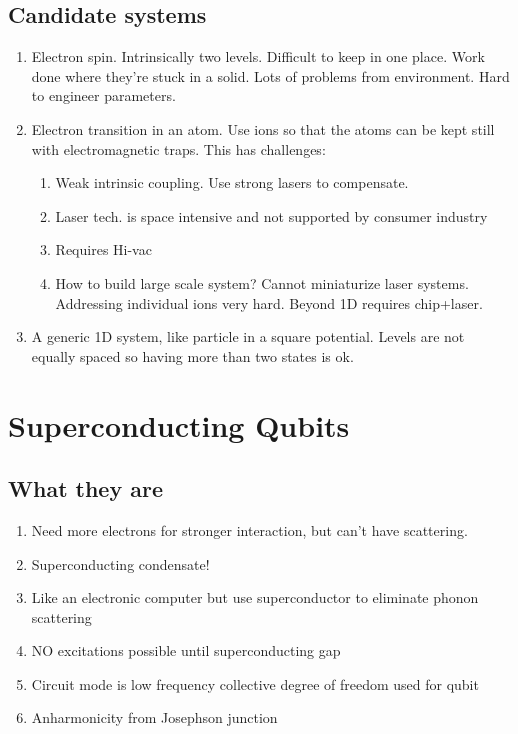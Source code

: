 \documentclass{report}
\begin{document}
\subsection{Candidate systems}
\begin{enumerate}
\item  Electron spin. Intrinsically two levels. Difficult to keep in one place. Work done where they're stuck in a solid. Lots of problems from environment. Hard to engineer parameters.
\item Electron transition in an atom. Use ions so that the atoms can be kept still with electromagnetic traps. This has challenges:

	\begin{enumerate}
	\item Weak intrinsic coupling. Use strong lasers to compensate.
	\item Laser tech. is space intensive and not supported by consumer industry
	\item Requires Hi-vac
	\item How to build large scale system? Cannot miniaturize laser systems. Addressing individual ions very hard. Beyond 1D requires chip+laser.
	\end{enumerate}
\item A generic 1D system, like particle in a square potential. Levels are not equally spaced so having more than two states is ok.
\end{enumerate}

\section{Superconducting Qubits}

\subsection{What they are}
\begin{enumerate}
\item Need more electrons for stronger interaction, but can't have scattering.
\item Superconducting condensate!
\item Like an electronic computer but use superconductor to eliminate phonon scattering
\item NO excitations possible until superconducting gap
\item Circuit mode is low frequency collective degree of freedom used for qubit
\item Anharmonicity from Josephson junction
\end{enumerate}
\end{document}
